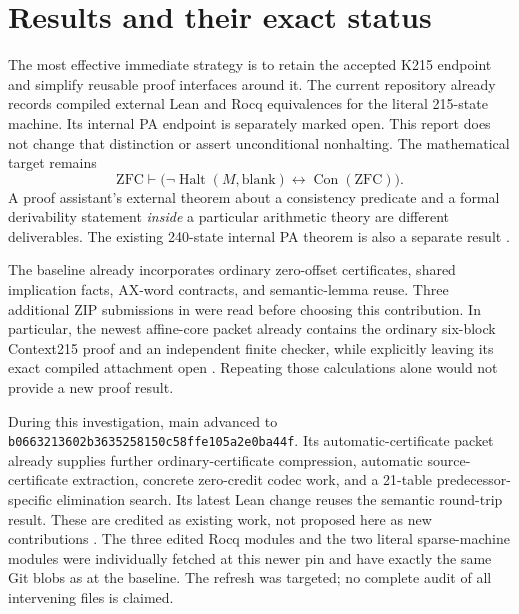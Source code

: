 \documentclass[11pt]{article}
\newcommand{\Con}{\operatorname{Con}}
\newcommand{\Halt}{\operatorname{Halt}}
\begin{document}
\section{Results and their exact status}

The most effective immediate strategy is to retain the accepted K215 endpoint and simplify reusable proof interfaces around it. The current repository already records compiled external Lean and Rocq equivalences for the literal 215-state machine. Its internal PA endpoint is separately marked open. This report does not change that distinction or assert unconditional nonhalting. The mathematical target remains
\[
 \mathrm{ZFC}\vdash
 \bigl(\neg\Halt(M,\mathrm{blank})\leftrightarrow\Con(\mathrm{ZFC})\bigr).
\]
A proof assistant's external theorem about a consistency predicate and a formal derivability statement \emph{inside} a particular arithmetic theory are different deliverables. The existing 240-state internal PA theorem is also a separate result \cite{baseline,formal}.

The baseline already incorporates ordinary zero-offset certificates, shared implication facts, AX-word contracts, and semantic-lemma reuse. Three additional ZIP submissions in  were read before choosing this contribution. In particular, the newest affine-core packet already contains the ordinary six-block Context215 proof and an independent finite checker, while explicitly leaving its exact compiled attachment open \cite{incoming}. Repeating those calculations alone would not provide a new proof result.

During this investigation, main advanced to \texttt{b0663213602b3635258150c58ffe105a2e0ba44f}. Its automatic-certificate packet already supplies further ordinary-certificate compression, automatic source-certificate extraction, concrete zero-credit codec work, and a 21-table predecessor-specific elimination search. Its latest Lean change reuses the semantic round-trip result. These are credited as existing work, not proposed here as new contributions \cite{refresh}. The three edited Rocq modules and the two literal sparse-machine modules were individually fetched at this newer pin and have exactly the same Git blobs as at the baseline. The refresh was targeted; no complete audit of all intervening files is claimed.
\end{document}
